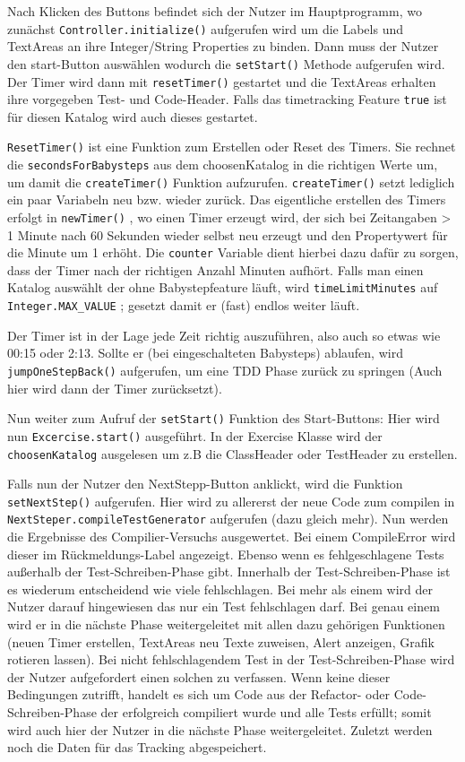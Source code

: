 \documentclass[10pt]{article}
\begin{document}
Nach Klicken des Buttons befindet sich der Nutzer im Hauptprogramm, wo zunächst \verb+Controller.initialize()+  aufgerufen wird um die Labels und TextAreas an ihre Integer/String Properties zu binden. Dann muss der Nutzer den start-Button auswählen wodurch die \verb+setStart()+ Methode aufgerufen wird. Der Timer wird dann mit \verb+resetTimer()+ gestartet und die TextAreas erhalten ihre vorgegeben Test- und Code-Header. Falls das timetracking Feature \verb+true+ ist für diesen Katalog wird auch dieses gestartet.

\verb+ResetTimer()+ ist eine Funktion zum Erstellen oder Reset des Timers. Sie rechnet die \verb+secondsForBabysteps+ aus dem choosenKatalog in die richtigen Werte um, um damit die \verb+createTimer()+ Funktion aufzurufen. \verb+createTimer()+ setzt lediglich ein paar Variabeln neu bzw. wieder zurück. Das eigentliche erstellen des Timers erfolgt in \verb+newTimer()+ , wo einen Timer erzeugt wird, der sich bei Zeitangaben > 1 Minute nach 60 Sekunden wieder selbst neu erzeugt und den Propertywert für die Minute um 1 erhöht. Die \verb+counter+ Variable dient hierbei dazu dafür zu sorgen, dass der Timer nach der richtigen Anzahl Minuten aufhört. 
Falls man einen Katalog auswählt der ohne Babystepfeature läuft, wird \verb+timeLimitMinutes+ auf \verb+Integer.MAX_VALUE+ ; gesetzt damit er (fast) endlos weiter läuft.

Der Timer ist in der Lage jede Zeit richtig auszuführen, also auch so etwas wie 00:15 oder 2:13.
Sollte er (bei eingeschalteten Babysteps) ablaufen, wird \verb+jumpOneStepBack()+ aufgerufen, um eine TDD Phase zurück zu springen (Auch hier wird dann der Timer zurücksetzt).

Nun weiter zum Aufruf der \verb+setStart()+ Funktion des Start-Buttons: Hier wird nun \verb+Excercise.start()+ ausgeführt. In der Exercise Klasse wird der \linebreak \verb+choosenKatalog+ ausgelesen um z.B die ClassHeader oder TestHeader zu erstellen.

Falls nun der Nutzer den NextStepp-Button anklickt, wird die Funktion \verb+setNextStep()+ aufgerufen.
Hier wird zu allererst der neue Code zum compilen in \verb+NextSteper.compileTestGenerator+ aufgerufen (dazu gleich mehr). Nun werden die Ergebnisse des Compilier-Versuchs ausgewertet. Bei einem CompileError wird dieser im Rückmeldungs-Label angezeigt. Ebenso wenn es fehlgeschlagene Tests außerhalb der Test-Schreiben-Phase gibt. Innerhalb der Test-Schreiben-Phase ist es wiederum entscheidend wie viele fehlschlagen. Bei mehr als einem wird der Nutzer darauf hingewiesen das nur ein Test fehlschlagen darf. Bei genau einem wird er in die nächste Phase weitergeleitet mit allen dazu gehörigen Funktionen (neuen Timer erstellen,  TextAreas neu Texte zuweisen, Alert anzeigen, Grafik rotieren lassen).
Bei nicht fehlschlagendem Test in der Test-Schreiben-Phase wird der Nutzer aufgefordert einen solchen zu verfassen.
Wenn keine dieser Bedingungen zutrifft, handelt es sich um Code aus der Refactor- oder Code-Schreiben-Phase der erfolgreich compiliert wurde und alle Tests erfüllt; somit wird auch hier der Nutzer in die nächste Phase weitergeleitet.
Zuletzt werden noch die Daten für das Tracking abgespeichert.
\end{document}
